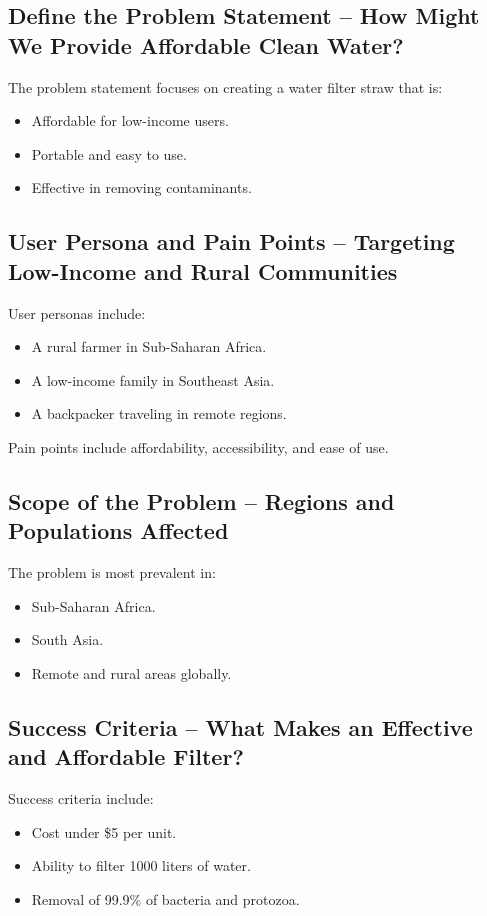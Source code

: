 \documentclass{article}
\begin{document}
\vspace{0.3cm}

\subsection{Define the Problem Statement – How Might We Provide Affordable Clean Water?}
The problem statement focuses on creating a water filter straw that is:
\begin{itemize}
    \item Affordable for low-income users.
    \item Portable and easy to use.
    \item Effective in removing contaminants.
\end{itemize}

\vspace{0.3cm}

\subsection{User Persona and Pain Points – Targeting Low-Income and Rural Communities}
User personas include:
\begin{itemize}
    \item A rural farmer in Sub-Saharan Africa.
    \item A low-income family in Southeast Asia.
    \item A backpacker traveling in remote regions.
\end{itemize}
Pain points include affordability, accessibility, and ease of use.

\vspace{0.3cm}

\subsection{Scope of the Problem – Regions and Populations Affected}
The problem is most prevalent in:
\begin{itemize}
    \item Sub-Saharan Africa.
    \item South Asia.
    \item Remote and rural areas globally.
\end{itemize}

\vspace{0.3cm}

\subsection{Success Criteria – What Makes an Effective and Affordable Filter?}
Success criteria include:
\begin{itemize}
    \item Cost under \$5 per unit.
    \item Ability to filter 1000 liters of water.
    \item Removal of 99.9\% of bacteria and protozoa.
\end{itemize}
\end{document}
